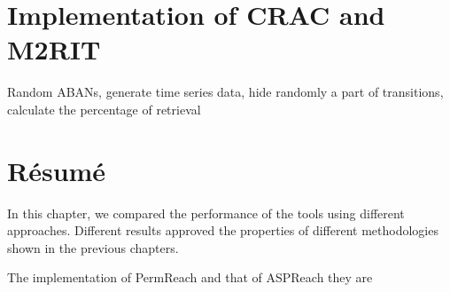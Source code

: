 \section{Implementation of CRAC and M2RIT}

Random ABANs, generate time series data, hide randomly a part of transitions, calculate the percentage of retrieval

\section{R\'esum\'e}

In this chapter, we compared the performance of the tools using different approaches.
Different results approved the properties of different methodologies shown in the previous chapters.

The implementation of PermReach and that of ASPReach they are 